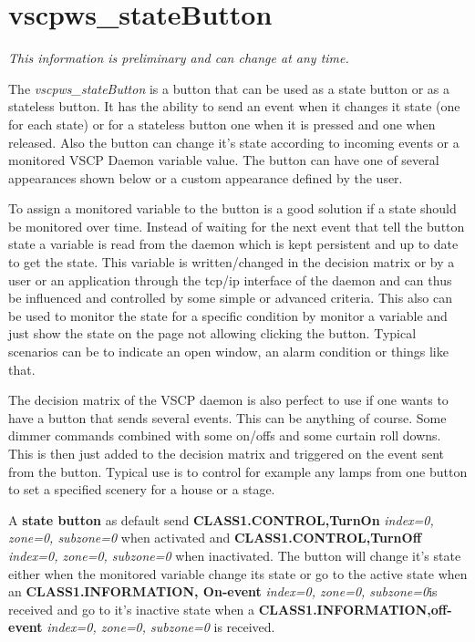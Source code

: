 \documentclass{article}
\begin{document}
        
        \section*{vscpws\_stateButton}
        \par \textit{This information is preliminary and can change at any time.}
        
        \par 
        The \textit{vscpws\_stateButton} is a button that can be used as a state button or
        as a stateless button. It has the ability to send an event when it changes
        it state (one for each state) or for a stateless button one when it is pressed
        and one when released. Also the button can change it's state according to 
        incoming events or a monitored VSCP Daemon variable value. The button can 
        have one of several appearances shown below or a custom appearance defined 
        by the user.
        
        \par 
        To assign a monitored variable to the button is a good solution if a state 
        should be monitored over
        time. Instead of waiting for the next event that tell the button state a
        variable is read from the daemon which is kept persistent and up to date to
        get the state. This variable is written/changed in the decision matrix or
        by a user or an application through the tcp/ip interface of the daemon
        and can thus be influenced and controlled by some simple or advanced criteria.
        This also can be used to monitor the state for a specific condition by
        monitor a variable and just show the state on the page not allowing clicking
        the button. Typical scenarios can be to indicate an open window, an alarm 
        condition or things like that.
        
        \par 
        The decision matrix of the VSCP daemon is also perfect to use if one wants 
        to have a button that sends several events. This can be anything of course. 
        Some dimmer commands combined with some on/offs and some curtain roll downs. 
        This is then just added to the 
        decision matrix and triggered on the event sent from the button. Typical use
        is to control for example any lamps from one button to set a specified scenery
        for a house or a stage.
        
        \par 
        A \textbf{state button} as default send \textbf{CLASS1.CONTROL,TurnOn} 
        \textit{index=0, zone=0, subzone=0} when 
        activated and \textbf{CLASS1.CONTROL,TurnOff} \textit{index=0, zone=0, subzone=0} when 
        inactivated. The button will change it's state either when the monitored
        variable change its state or go to the active state when an 
        \textbf{CLASS1.INFORMATION, On-event} \textit{index=0, zone=0, subzone=0}is  
        received and go to it's inactive state when a 
        \textbf{CLASS1.INFORMATION,off-event} \textit{index=0, zone=0, subzone=0} is received.
        
\end{document}
